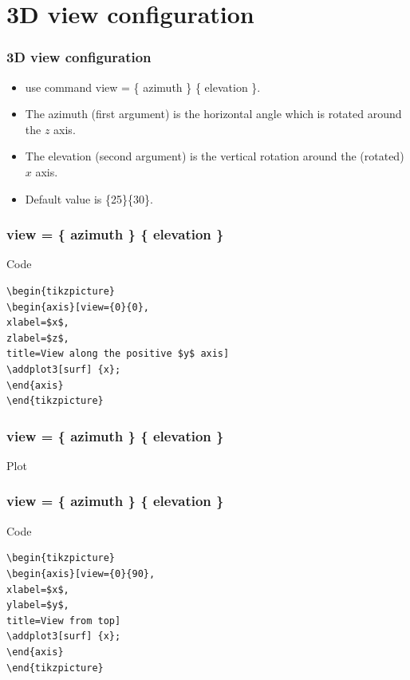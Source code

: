 \documentclass{beamer}
\begin{document}
\section{3D view configuration}
\begin{frame}[fragile]
\frametitle{3D view configuration}
\begin{itemize}
\item use command \color{blue} view \color{black} = \{ azimuth \} \{ elevation \}.
\item The azimuth (first argument) is the horizontal angle which is rotated around the $z$ axis.
\item The elevation (second argument) is the vertical rotation around the (rotated) $x$ axis.
\item Default value is \{25\}\{30\}.
\end{itemize}
\end{frame}
\begin{frame}[fragile]
\frametitle{\color{blue} view \color{black} = \{ azimuth \} \{ elevation \}}
\begin{block}{Code}
\begin{verbatim}
\begin{tikzpicture}
\begin{axis}[view={0}{0},
xlabel=$x$,
zlabel=$z$,
title=View along the positive $y$ axis]
\addplot3[surf] {x};
\end{axis}
\end{tikzpicture}
\end{verbatim}
\end{block}
\end{frame}
\begin{frame}[fragile]
\frametitle{\color{blue} view \color{black} = \{ azimuth \} \{ elevation \}}
\begin{block}{Plot}
\end{block}
\end{frame}
\begin{frame}[fragile]
\frametitle{\color{blue} view \color{black} = \{ azimuth \} \{ elevation \}}
\begin{block}{Code}
\begin{verbatim}
\begin{tikzpicture}
\begin{axis}[view={0}{90},
xlabel=$x$,
ylabel=$y$,
title=View from top]
\addplot3[surf] {x};
\end{axis}
\end{tikzpicture}
\end{verbatim}
\end{block}
\end{frame}
\end{document}
